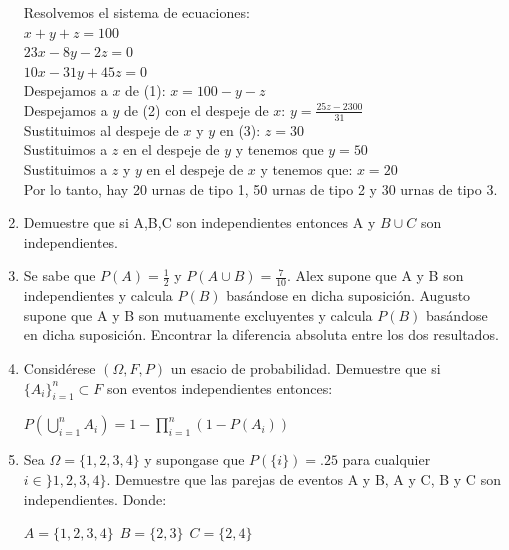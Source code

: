 \documentclass[12pt,a4paper]{report}
\begin{document}
\begin{enumerate}
{Resolvemos el sistema de ecuaciones:\\
$x + y + z = 100$\\
$23x -8y-2z = 0$\\
$10x -31y +45z = 0$\\

Despejamos a $x$ de (1): $ x = 100 -y -z$\\
Despejamos a $y$ de (2) con el despeje de $x$: $ y = \frac{25z -2300}{31}$\\
Sustituimos al despeje de $x$ y $y$ en (3): $z = 30$\\
Sustituimos a $z$ en el despeje de $y$ y tenemos que $y = 50$\\
Sustituimos a $z$ y $y$ en el despeje de $x$ y tenemos que: $x = 20$\\

Por lo tanto, hay 20 urnas de tipo 1, 50 urnas de tipo 2 y 30 urnas de tipo 3.\\

	}

   \item {
   Demuestre que si A,B,C son independientes entonces A y $B\cup C$ son independientes.

    }

   \item {
   Se sabe que $P(A)= \frac{1}{2}$ y $P(A\cup B)=\frac{7}{10}$. Alex supone que A y B son independientes y calcula $P(B)$ basándose en dicha suposición. Augusto supone que A y B son mutuamente excluyentes y calcula $P(B)$ basándose en dicha suposición. Encontrar la diferencia absoluta entre los dos resultados.
	}

   \item {
   Considérese $(\Omega,F, P)$ un esacio de probabilidad. Demuestre que si $\lbrace A_{i} \rbrace _{i=1}^{n} \subset F$ son eventos independientes entonces:\\
   \begin{center}
   $P(\bigcup\limits_{i=1}^{n} A_{i})=1-\prod\limits_{i=1}^{n} (1-P(A_{i}))$
   \end{center}
	}

   \item {
    Sea $\Omega = \lbrace 1,2,3,4 \rbrace$ y supongase que $P(\lbrace i \rbrace)=.25$ para cualquier $i\in \rbrace 1,2,3,4 \rbrace$. Demuestre que las parejas de eventos A y B, A y C, B y C son independientes. Donde:\\
    \begin{center}
    $A=\lbrace 1,2,3,4 \rbrace \ \ B=\lbrace 2,3 \rbrace \ \ C= \lbrace 2,4 \rbrace $
\end{center}
	}


\end{enumerate}
\end{document}
